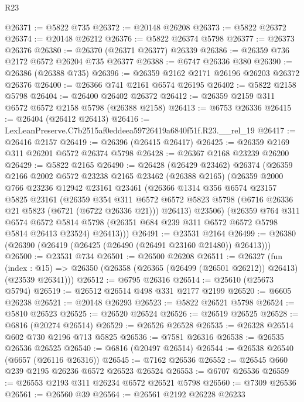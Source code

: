 \begin{lexlean}{R23}
\begin{coremodule}
@26371 := @5822 @735
@26372 := @20148 @26208
@26373 := @5822 @26372
@26374 := @20148 @26212
@26376 := @5822 @26374 @5798
@26377 := @26373 @26376
@26380 := @26370 (@26371 @26377) @26339
@26386 := @26359 @736 @2172 @6572 @26204 @735 @26377
@26388 := @6747 @26336 @380
@26390 := @26386 (@26388 @735)
@26396 := @26359 @2162 @2171 @26196 @26203 @26372 @26376
@26400 := @26366 @741 @2161 @6574 @26195
@26402 := @5822 @2158 @5798
@26404 := @26400 @26402 @26372
@26412 := @26359 @2159 @311 @6572 @6572 @2158 @5798 (@26388 @2158)
@26413 := @6753 @26336
@26415 := @26404 (@26412 @26413)
@26416 := LexLeanPreserve.C7b2515af0eddeea59726419a6840f51f.R23.__rel_19
@26417 := @26416 @2157
@26419 := @26396 (@26415 @26417)
@26425 := @26359 @2169 @311 @26201 @6572 @26374 @5798
@26428 := @26367 @2168 @23239 @26200
@26429 := @5822 @2165
@26490 := @26428
    (@26429 @23462)
    @26374
    (@26359
      @2166
      @2002
      @6572
      @23238
      @2165
      @23462
      (@26388 @2165)
      (@26359
        @2000
        @766
        @23236
        @12942
        @23161
        @23461
        (@26366
          @1314
          @356
          @6574
          @23157
          @5825
          @23161
          (@26359
            @354
            @311
            @6572
            @6572
            @5823
            @5798
            (@6716 @26336 @21 @5823 (@6721 (@6722 @26336 @21)))
            @26413)
          @23506)
        (@26359
          @764
          @311
          @6574
          @6572
          @5814
          @5798
          (@26351 @684 @239 @311 @6572 @6572 @5798 @5814 @26413 @23524)
          @26413)))
@26491 := @23531 @2164
@26499 := @26380 (@26390 (@26419 (@26425 (@26490 (@26491 @23160 @21480)) @26413)))
@26500 := @23531 @734
@26501 := @26500 @26208
@26511 := @26327
    (fun (index : @15) => @26350 (@26358 (@26365 (@26499 (@26501 @26212)) @26413) (@23539 @26341)))
@26512 := @6795 @26316
@26514 := @25610 (@25673 @5794)
@26519 := @26512 @26514 @498 @331 @2177 @2199
@26520 := @6605 @26238
@26521 := @20148 @26293
@26523 := @5822 @26521 @5798
@26524 := @5810 @26523
@26525 := @26520 @26524
@26526 := @26519 @26525
@26528 := @6816 (@20274 @26514)
@26529 := @26526 @26528
@26535 := @26328 @26514 @602 @730 @2196 @713 @5825
@26536 := @7581 @26316
@26538 := @26535 @26536 @26525
@26540 := @6816 (@20497 @26514)
@26544 := @26538 @26540 (@6657 (@26116 @26316))
@26545 := @7162 @26536
@26552 := @26545 @660 @239 @2195 @26236 @6572 @26523 @26524
@26553 := @6707 @26536
@26559 := @26553 @2193 @311 @26234 @6572 @26521 @5798
@26560 := @7309 @26536
@26561 := @26560 @39
@26564 := @26561 @2192 @26228 @26233

\end{coremodule}
\end{lexlean}
